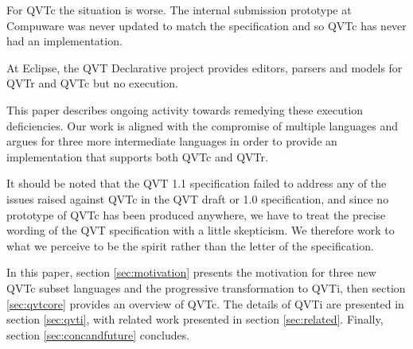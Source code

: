 For QVTc the situation is worse. The internal submission prototype at Compuware was never updated to match the specification and so QVTc has never had an implementation.

At Eclipse, the QVT Declarative project provides editors, parsers and models for QVTr and QVTc but no execution. 

This paper describes ongoing activity towards remedying these execution deficiencies. Our work is aligned with the compromise of multiple languages and argues for three more intermediate languages in order to provide an implementation that supports both QVTc and QVTr. 

It should be noted that the QVT 1.1 specification failed to address any of the issues raised against QVTc in the QVT draft or 1.0 specification, and since no prototype of QVTc has been produced anywhere, we have to treat the precise wording of the QVT specification with a little skepticism. We therefore work to what we perceive to be the spirit rather than the letter of the specification.



In this paper, section \ref{sec:motivation} presents the motivation for three new QVTc subset languages and the progressive transformation to QVTi, then section \ref{sec:qvtcore} provides an overview of QVTc. The details of QVTi are presented in section \ref{sec:qvti}, with related work presented in section \ref{sec:related}. Finally, section \ref{sec:concandfuture} concludes.